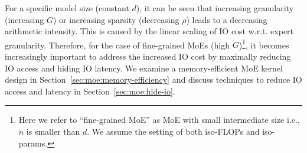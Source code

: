 For a specific model size (constant $d$), it can be seen that increasing granularity (increasing $G$) or increasing sparsity (decreasing $\rho$) leads to a decreasing arithmetic intensity. This is caused by the linear scaling of IO cost w.r.t. expert granularity. Therefore, for the case of fine-grained MoEs (high $G$)\footnote{Here we refer to ``fine-grained MoE'' as MoE with small intermediate size i.e., $n$ is smaller than $d$. We assume the setting of both iso-FLOPs and iso-params.}, it becomes increasingly important to address the increased IO cost by maximally reducing IO access and hiding IO latency. We examine a memory-efficient MoE kernel design in Section~\ref{sec:moe:memory-efficiency} and discuss techniques to reduce IO access and latency in Section~\ref{sec:moe:hide-io}.








